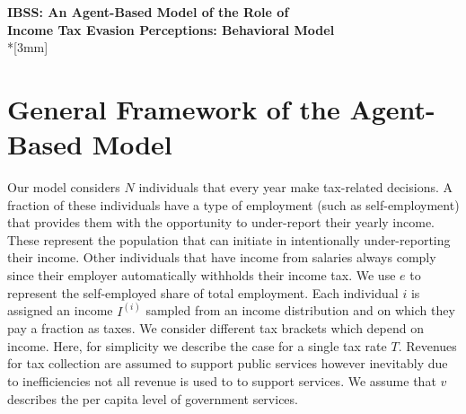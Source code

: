 \documentclass{NSF_proposal_mod}
\begin{document}
\begin{center}
{\Large{\bf IBSS: An Agent-Based Model of the Role of \\ Income Tax Evasion Perceptions: Behavioral Model}}\\*[3mm]
\end{center}





\section{General Framework of the Agent-Based Model}
\label{Sec:General}


Our model considers $N$ individuals that every year make tax-related decisions. A fraction of these individuals have a type of employment (such as self-employment) that provides them with the opportunity to under-report their yearly income. These represent the population that can initiate in intentionally under-reporting their income.  Other individuals that have income from salaries always comply since their employer automatically withholds their income tax. We use $e$ to represent the self-employed share of total employment. Each individual $i$ is assigned an income $I^{(i)}$ sampled from an income distribution and on which they pay a fraction as taxes. We consider different tax brackets which depend on income. Here, for simplicity we describe the case for a single tax rate $T$. Revenues for tax collection are assumed to support public services however inevitably due to inefficiencies not all revenue is used to to support services. We assume that $v$ describes the per capita level of government services. 
\end{document}
